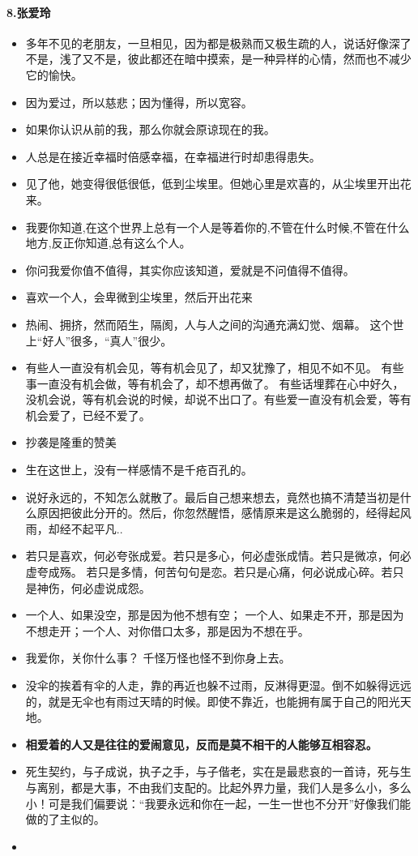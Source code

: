 \documentclass[UTF8,a4paper,8pt]{ctexart}
\begin{document}
 \paragraph{8.张爱玲}
 \begin{itemize}
 	\item  多年不见的老朋友，一旦相见，因为都是极熟而又极生疏的人，说话好像深了不是，浅了又不是，彼此都还在暗中摸索，是一种异样的心情，然而也不减少它的愉快。
 	\item  因为爱过，所以慈悲；因为懂得，所以宽容。
 	\item  如果你认识从前的我，那么你就会原谅现在的我。
 	\item  人总是在接近幸福时倍感幸福，在幸福进行时却患得患失。
 	\item  见了他，她变得很低很低，低到尘埃里。但她心里是欢喜的，从尘埃里开出花来。
 	\item  我要你知道,在这个世界上总有一个人是等着你的,不管在什么时候,不管在什么地方,反正你知道,总有这么个人。
 	\item  你问我爱你值不值得，其实你应该知道，爱就是不问值得不值得。
 	\item  喜欢一个人，会卑微到尘埃里，然后开出花来
 	\item  热闹、拥挤，然而陌生，隔阂，人与人之间的沟通充满幻觉、烟幕。 这个世上“好人”很多，“真人”很少。
 	\item  有些人一直没有机会见，等有机会见了，却又犹豫了，相见不如不见。 有些事一直没有机会做，等有机会了，却不想再做了。 有些话埋葬在心中好久，没机会说，等有机会说的时候，却说不出口了。有些爱一直没有机会爱，等有机会爱了，已经不爱了。
 	\item  抄袭是隆重的赞美
 	\item  生在这世上，没有一样感情不是千疮百孔的。
 	\item  说好永远的，不知怎么就散了。最后自己想来想去，竟然也搞不清楚当初是什么原因把彼此分开的。然后，你忽然醒悟，感情原来是这么脆弱的，经得起风雨，却经不起平凡..
 	\item  若只是喜欢，何必夸张成爱。若只是多心，何必虚张成情。若只是微凉，何必虚夸成殇。 若只是多情，何苦句句是恋。若只是心痛，何必说成心碎。若只是神伤，何必虚说成怨。
 	\item  一个人、如果没空，那是因为他不想有空； 一个人、如果走不开，那是因为不想走开；一个人、对你借口太多，那是因为不想在乎。
 	\item  我爱你，关你什么事？ 千怪万怪也怪不到你身上去。
 	\item  没伞的挨着有伞的人走，靠的再近也躲不过雨，反淋得更湿。倒不如躲得远远的，就是无伞也有雨过天晴的时候。即使不靠近，也能拥有属于自己的阳光天地。
 	\item  \textbf{相爱着的人又是往往的爱闹意见，反而是莫不相干的人能够互相容忍。}
 	\item  死生契约，与子成说，执子之手，与子偕老，实在是最悲哀的一首诗，死与生与离别，都是大事，不由我们支配的。比起外界力量，我们人是多么小，多么小！可是我们偏要说：“我要永远和你在一起，一生一世也不分开”好像我们能做的了主似的。
 	\item 
 \end{itemize}		
 
\end{document}
